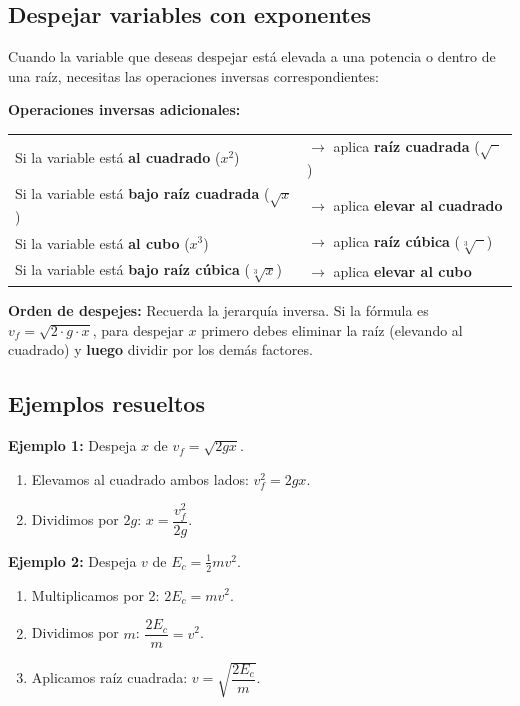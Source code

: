 \documentclass[12pt, letterpaper]{article}
\begin{document}
\subsection{Despejar variables con exponentes}

Cuando la variable que deseas despejar está elevada a una potencia o dentro de una raíz, necesitas las operaciones inversas correspondientes:

\begin{cuadroteoria}
  \textbf{Operaciones inversas adicionales:}
  \begin{center}
    \begin{tabular}{ll}
      Si la variable está \textbf{al cuadrado} ($x^2$)              & $\longrightarrow$ aplica \textbf{raíz cuadrada} ($\sqrt{\phantom{x}}$)  \\
      Si la variable está \textbf{bajo raíz cuadrada} ($\sqrt{x}$)  & $\longrightarrow$ aplica \textbf{elevar al cuadrado}                    \\
      Si la variable está \textbf{al cubo} ($x^3$)                  & $\longrightarrow$ aplica \textbf{raíz cúbica} ($\sqrt[3]{\phantom{x}}$) \\
      Si la variable está \textbf{bajo raíz cúbica} ($\sqrt[3]{x}$) & $\longrightarrow$ aplica \textbf{elevar al cubo}
    \end{tabular}
  \end{center}
\end{cuadroteoria}

\begin{cuadroadvertencia}
  \textbf{Orden de despejes:} Recuerda la jerarquía inversa. Si la fórmula es $v_f = \sqrt{2 \cdot g \cdot x}$, para despejar $x$ primero debes eliminar la raíz (elevando al cuadrado) y \textbf{luego} dividir por los demás factores.
\end{cuadroadvertencia}

\subsection{Ejemplos resueltos}

\noindent\textbf{Ejemplo 1:} Despeja $x$ de $v_f = \sqrt{2gx}$.
\begin{enumerate}
  \item Elevamos al cuadrado ambos lados: $v_f^2 = 2gx$.
  \item Dividimos por $2g$: $x = \dfrac{v_f^2}{2g}$.
\end{enumerate}

\noindent\textbf{Ejemplo 2:} Despeja $v$ de $E_c = \frac{1}{2}mv^2$.
\begin{enumerate}
  \item Multiplicamos por 2: $2E_c = mv^2$.
  \item Dividimos por $m$: $\dfrac{2E_c}{m} = v^2$.
  \item Aplicamos raíz cuadrada: $v = \sqrt{\dfrac{2E_c}{m}}$.
\end{enumerate}
\end{document}
